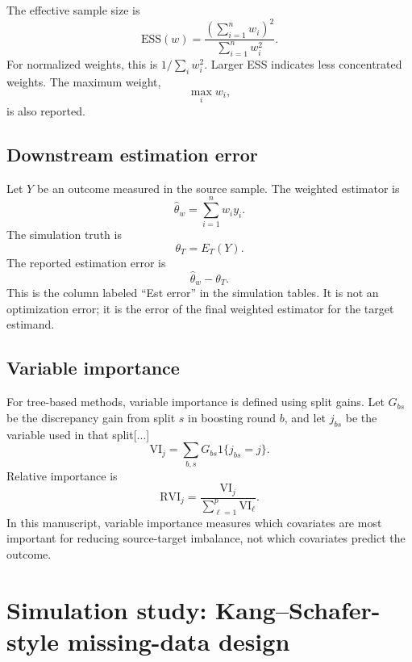 \documentclass[11pt]{article}
\begin{document}
{The effective sample size is
\begin{equation*}
\mathrm{ESS}(w)
=
\frac{\left(\sum_{i=1}^n w_i\right)^2}{\sum_{i=1}^n w_i^2}.
\end{equation*}
For normalized weights, this is $1/\sum_i w_i^2$. Larger ESS indicates less concentrated weights. The maximum weight,
\begin{equation*}
\max_i w_i,
\end{equation*}
is also reported.

\subsection{Downstream estimation error}

Let $Y$ be an outcome measured in the source sample. The weighted estimator is
\begin{equation*}
\widehat\theta_w=\sum_{i=1}^n w_i y_i.
\end{equation*}
The simulation truth is
\begin{equation*}
\theta_T=E_T(Y).
\end{equation*}
The reported estimation error is
\begin{equation*}
\widehat\theta_w-\theta_T.
\end{equation*}
This is the column labeled ``Est error'' in the simulation tables. It is not an optimization error; it is the error of the final weighted estimator for the target estimand.

\subsection{Variable importance}

For tree-based methods, variable importance is defined using split gains. Let $G_{bs}$ be the discrepancy gain from split $s$ in boosting round $b$, and let $j_{bs}$ be the variable used in that split[...]
\begin{equation*}
\mathrm{VI}_j
=
\sum_{b,s}G_{bs}1\{j_{bs}=j\}.
\end{equation*}
Relative importance is
\begin{equation*}
\mathrm{RVI}_j
=
\frac{\mathrm{VI}_j}{\sum_{\ell=1}^p \mathrm{VI}_{\ell}}.
\end{equation*}
In this manuscript, variable importance measures which covariates are most important for reducing source-target imbalance, not which covariates predict the outcome.

\section{Simulation study: Kang--Schafer-style missing-data design}

}
\end{document}
